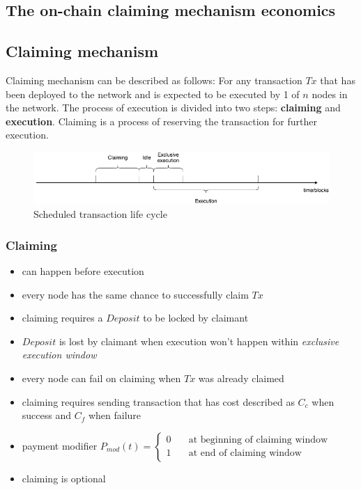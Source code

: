 \documentclass{report}
\begin{document}
  \begin{appendices}
    \chapter{The on-chain claiming mechanism economics}\label{appendix}
    \section{Claiming mechanism}
  Claiming mechanism can be described as follows:
  For any transaction $Tx$ that has been deployed to the network and is expected to be executed by 1 of $n$ nodes in the network. The process of execution is divided into two steps:
  \textbf{claiming} and \textbf{execution}. Claiming is a process of reserving the transaction for further execution.
  \begin{figure}
    \includegraphics[width=\linewidth]{claiming/timeranges.png}
    \caption{Scheduled transaction life cycle}
    \label{fig:boat1}
  \end{figure}
  
  \subsection{Claiming}
  \begin{itemize}
  \item can happen before execution
  \item every node has the same chance to successfully claim $Tx$
  \item claiming requires a $Deposit$ to be locked by claimant
  \item $Deposit$ is lost by claimant when execution won't happen within \textit{exclusive execution window}
  \item every node can fail on claiming when $Tx$ was already claimed
  \item claiming requires sending transaction that has cost described as $C_{c}$ when success and $C_{f}$ when failure
  \item payment modifier $P_{mod}(t)=\begin{cases}
  0 & \quad \text{at beginning of claiming window}\\
  1 & \quad \text{at end of claiming window}
  \end{cases}$ 
  \item claiming is optional
  \end{itemize}
  

\end{appendices}
\end{document}
